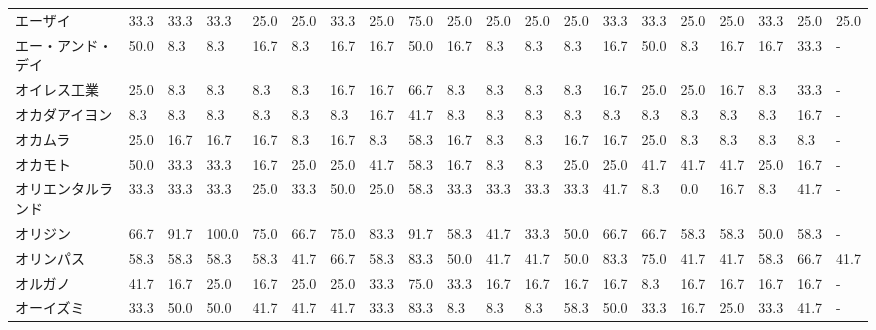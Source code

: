 \documentclass[a4paper，11pt]{jsarticle}
\begin{document}
\begin{longtable}[c]{lp{3mm}p{3mm}p{3mm}p{3mm}p{3mm}p{3mm}p{3mm}p{3mm}p{3mm}p{3mm}p{3mm}p{3mm}p{3mm}p{3mm}p{3mm}p{3mm}p{3mm}p{3mm}p{3mm}}
エーザイ            &   33.3 &   33.3 &      33.3 &      25.0 &       25.0 &   33.3 &   25.0 &   75.0 &    25.0 &    25.0 &   25.0 &  25.0 &   33.3 &    33.3 &    25.0 &  25.0 &  33.3 &  25.0 &  25.0 \\
エー・アンド・デイ       &   50.0 &    8.3 &       8.3 &      16.7 &        8.3 &   16.7 &   16.7 &   50.0 &    16.7 &     8.3 &    8.3 &   8.3 &   16.7 &    50.0 &     8.3 &  16.7 &  16.7 &  33.3 &     - \\
オイレス工業          &   25.0 &    8.3 &       8.3 &       8.3 &        8.3 &   16.7 &   16.7 &   66.7 &     8.3 &     8.3 &    8.3 &   8.3 &   16.7 &    25.0 &    25.0 &  16.7 &   8.3 &  33.3 &     - \\
オカダアイヨン         &    8.3 &    8.3 &       8.3 &       8.3 &        8.3 &    8.3 &   16.7 &   41.7 &     8.3 &     8.3 &    8.3 &   8.3 &    8.3 &     8.3 &     8.3 &   8.3 &   8.3 &  16.7 &     - \\
オカムラ            &   25.0 &   16.7 &      16.7 &      16.7 &        8.3 &   16.7 &    8.3 &   58.3 &    16.7 &     8.3 &    8.3 &  16.7 &   16.7 &    25.0 &     8.3 &   8.3 &   8.3 &   8.3 &     - \\
オカモト            &   50.0 &   33.3 &      33.3 &      16.7 &       25.0 &   25.0 &   41.7 &   58.3 &    16.7 &     8.3 &    8.3 &  25.0 &   25.0 &    41.7 &    41.7 &  41.7 &  25.0 &  16.7 &     - \\
オリエンタルランド       &   33.3 &   33.3 &      33.3 &      25.0 &       33.3 &   50.0 &   25.0 &   58.3 &    33.3 &    33.3 &   33.3 &  33.3 &   41.7 &     8.3 &     0.0 &  16.7 &   8.3 &  41.7 &     - \\
オリジン            &   66.7 &   91.7 &     100.0 &      75.0 &       66.7 &   75.0 &   83.3 &   91.7 &    58.3 &    41.7 &   33.3 &  50.0 &   66.7 &    66.7 &    58.3 &  58.3 &  50.0 &  58.3 &     - \\
オリンパス           &   58.3 &   58.3 &      58.3 &      58.3 &       41.7 &   66.7 &   58.3 &   83.3 &    50.0 &    41.7 &   41.7 &  50.0 &   83.3 &    75.0 &    41.7 &  41.7 &  58.3 &  66.7 &  41.7 \\
オルガノ            &   41.7 &   16.7 &      25.0 &      16.7 &       25.0 &   25.0 &   33.3 &   75.0 &    33.3 &    16.7 &   16.7 &  16.7 &   16.7 &     8.3 &    16.7 &  16.7 &  16.7 &  16.7 &     - \\
オーイズミ           &   33.3 &   50.0 &      50.0 &      41.7 &       41.7 &   41.7 &   33.3 &   83.3 &     8.3 &     8.3 &    8.3 &  58.3 &   50.0 &    33.3 &    16.7 &  25.0 &  33.3 &  41.7 &     - \\

\end{longtable}
\end{document}
